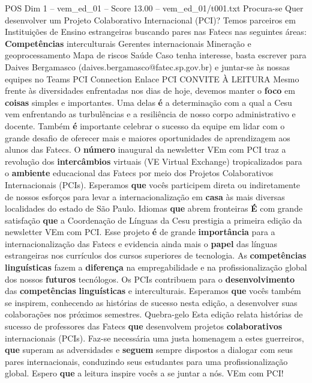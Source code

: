 \begin{textsample}{POS Dim 1 – vem\_ed\_01 – Score 13.00 – vem\_ed\_01/t001.txt}  \label{ex:f1_pos_094}
Procura-se Quer desenvolver um Projeto Colaborativo Internacional (PCI)?
Temos parceiros em Instituições de Ensino estrangeiras buscando pares nas Fatecs nas seguintes áreas: \textbf{Competências} interculturais Gerentes internacionais Mineração e geoprocessamento Mapa de riscos Saúde Caso tenha interesse, basta escrever para Daives Bergamasco (daives.bergamasco@fatec.sp.gov.br) e juntar-se às nossas equipes no Teams PCI Connection Enlace PCI CONVITE À LEITURA Mesmo frente às diversidades enfrentadas nos dias de hoje, devemos manter o \textbf{foco} em \textbf{coisas} simples e importantes.
Uma delas \textbf{é} a determinação com a qual a Cesu vem enfrentando as turbulências e a resiliência de nosso corpo administrativo e docente.
Também \textbf{é} importante celebrar o sucesso da equipe em lidar com o grande desafio de oferecer mais e maiores oportunidades de aprendizagem aos alunos das Fatecs.
O \textbf{número} inaugural da newsletter VEm com PCI traz a revolução dos \textbf{intercâmbios} virtuais (VE Virtual Exchange) tropicalizados para o \textbf{ambiente} educacional das Fatecs por meio dos Projetos Colaborativos Internacionais (PCIs).
Esperamos \textbf{que} vocês participem direta ou indiretamente de nossos esforços para levar a internacionalização em \textbf{casa} às mais diversas localidades do estado de São Paulo.
Idiomas \textbf{que} abrem fronteiras \textbf{É} com grande satisfação \textbf{que} a Coordenação de Línguas da Cesu prestigia a primeira edição da newsletter VEm com PCI.
Esse projeto \textbf{é} de grande \textbf{importância} para a internacionalização das Fatecs e evidencia ainda mais o \textbf{papel} das línguas estrangeiras nos currículos dos cursos superiores de tecnologia.
As \textbf{competências} \textbf{linguísticas} fazem a \textbf{diferença} na empregabilidade e na profissionalização global dos nossos \textbf{futuros} tecnólogos.
Os PCIs contribuem para o \textbf{desenvolvimento} das \textbf{competências} \textbf{linguísticas} e interculturais.
Esperamos \textbf{que} vocês também se inspirem, conhecendo as histórias de sucesso nesta edição, a desenvolver suas colaborações nos próximos semestres.
Quebra-gelo Esta edição relata histórias de sucesso de professores das Fatecs \textbf{que} desenvolvem projetos \textbf{colaborativos} internacionais (PCIs).
Faz-se necessária uma justa homenagem a estes guerreiros, \textbf{que} superam as adversidades e \textbf{seguem} sempre dispostos a dialogar com seus pares internacionais, conduzindo seus estudantes para uma profissionalização global.
Espero \textbf{que} a leitura inspire vocês a se juntar a nós.
VEm com PCI!

\end{textsample}
